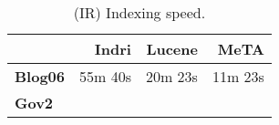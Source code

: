 \begin{table}[t]
\centering
{\small
\begin{tabular}{|l|r|r|r|}
        \hline & \textbf{Indri} & \textbf{Lucene} & \textbf{MeTA} \\
        \hline
        \textbf{Blog06} & 55m 40s & 20m 23s & 11m 23s \\
        \textbf{Gov2}   & & & \\
        \hline
\end{tabular}
\caption{(IR) Indexing speed.}
\label{table:ir-indexing}
}
\end{table}

